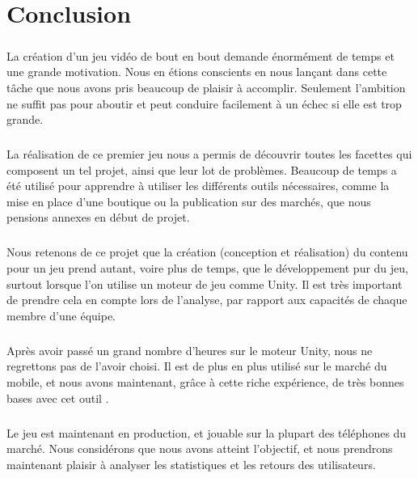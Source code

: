 \chapter{Conclusion}

\paragraph{}
La création d’un jeu vidéo de bout en bout demande énormément de temps et une grande motivation. Nous en étions conscients en nous lançant dans cette tâche que nous avons pris beaucoup de plaisir à accomplir. Seulement l’ambition ne suffit pas pour aboutir et peut conduire facilement à un échec si elle est trop grande.

\paragraph{}
La réalisation de ce premier jeu nous a permis de découvrir toutes les facettes qui composent un tel projet, ainsi que leur lot de problèmes. Beaucoup de temps a été utilisé pour apprendre à utiliser les différents outils nécessaires, comme la mise en place d’une boutique ou la publication sur des marchés, que nous pensions annexes en début de projet.

\paragraph{}
Nous retenons de ce projet que la création (conception et réalisation) du contenu pour un jeu prend autant, voire plus de temps, que le développement pur du jeu, surtout lorsque l'on utilise un moteur de jeu comme Unity. Il est très important de prendre cela en compte lors de l’analyse, par rapport aux capacités de chaque membre d'une équipe.

\paragraph{}
Après avoir passé un grand nombre d'heures sur le moteur Unity, nous ne regrettons pas de l'avoir choisi. Il est de plus en plus utilisé sur le marché du mobile, et nous avons maintenant, grâce à cette riche expérience, de très bonnes bases avec cet outil .

\paragraph{}
Le jeu est maintenant en production, et jouable sur la plupart des téléphones du marché. Nous considérons que nous avons atteint l'objectif, et nous prendrons maintenant plaisir à analyser les statistiques et les retours des utilisateurs.
